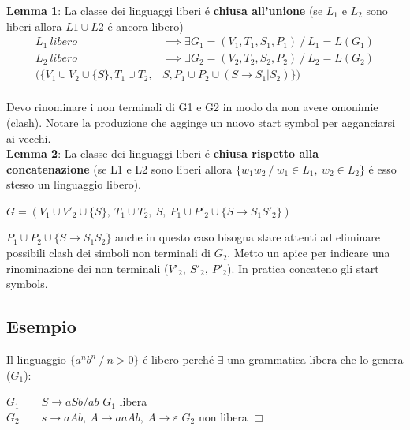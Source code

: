 \textbf{Lemma 1}: La classe dei linguaggi liberi \'e \textbf{chiusa all'unione} 
(se $L_1$ e $L_2$ sono liberi allora $L1 \cup L2$ \'e ancora libero)
\begin{equation}\begin{split}
	L_1\ libero\ & \implies \exists G_1=(V_1,T_1,S_1,P_1)\ / \ L_1 = L(G_1)\\
	L_2\ libero\ & \implies \exists G_2=(V_2,T_2,S_2,P_2)\ / \ L_2 = L(G_2)\\
	(\{ V_1 \cup V_2 \cup \{ S \},T_1 \cup T_2, & S,P_1 \cup P_2 \cup (S \rightarrow S_1|S_2) \})\\
\end{split}\end{equation} 

Devo rinominare i non terminali di G1 e G2 in modo da non avere omonimie (clash). 
Notare la produzione che agginge un nuovo start symbol per agganciarsi ai vecchi.\\[5pt]

\textbf{Lemma 2}: La classe dei linguaggi liberi \'e \textbf{chiusa rispetto alla concatenazione}
(se L1 e L2 sono liberi allora 
$\{w_1w_2 \ / \ w_1 \in L_1,\ w_2 \in L_2 \}$ \'e esso stesso un linguaggio libero).
\begin{center}
	$G = (V_1 \cup V'_2 \cup \{ S \},\ T_1 \cup T_2,\ S,\ P_1 \cup P'_2 \cup \{ S \rightarrow S_1S'_2\} )$
\end{center}

$P_1 \cup P_2 \cup \{ S \rightarrow S_1 S_2 \}$ anche in questo caso bisogna stare attenti ad eliminare possibili clash dei simboli non terminali di $G_2$. Metto un apice per indicare una rinominazione dei non terminali ($V'_2,\ S'_2,\ P'_2$). In pratica concateno gli start symbols.

\subsection{Esempio}
Il linguaggio $\{ a^nb^n\ / \ n > 0 \}$ \'e libero perch\'e $\exists$ una grammatica libera che lo genera ($G_1$):\\
\begin{center}
	$G_1\qquad S\rightarrow aSb/ab$ $G_1$ libera\\
	$G_2\qquad s\rightarrow aAb,\ A\rightarrow aaAb,\ A\rightarrow \varepsilon$ $G_2$ non libera $\Box$\\
\end{center}   

